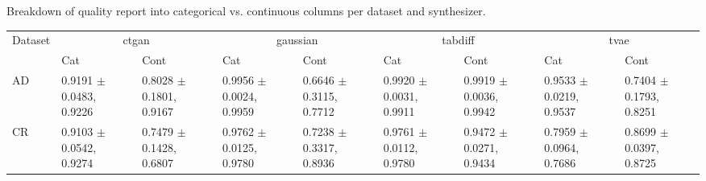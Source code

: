 \begin{tinytable}
\centering
\caption{Breakdown of quality report into categorical vs. continuous columns per dataset and synthesizer.}
\label{tab:quality_report}
\begin{tabular}{lllllllll}
\toprule
Dataset & \multicolumn{2}{c}{ctgan} & \multicolumn{2}{c}{gaussian} & \multicolumn{2}{c}{tabdiff} & \multicolumn{2}{c}{tvae} \\
 & Cat & Cont & Cat & Cont & Cat & Cont & Cat & Cont \\
\midrule
AD & 0.9191 $\pm$ 0.0483, 0.9226 & 0.8028 $\pm$ 0.1801, 0.9167 & 0.9956 $\pm$ 0.0024, 0.9959 & 0.6646 $\pm$ 0.3115, 0.7712 & 0.9920 $\pm$ 0.0031, 0.9911 & 0.9919 $\pm$ 0.0036, 0.9942 & 0.9533 $\pm$ 0.0219, 0.9537 & 0.7404 $\pm$ 0.1793, 0.8251 \\
CR & 0.9103 $\pm$ 0.0542, 0.9274 & 0.7479 $\pm$ 0.1428, 0.6807 & 0.9762 $\pm$ 0.0125, 0.9780 & 0.7238 $\pm$ 0.3317, 0.8936 & 0.9761 $\pm$ 0.0112, 0.9780 & 0.9472 $\pm$ 0.0271, 0.9434 & 0.7959 $\pm$ 0.0964, 0.7686 & 0.8699 $\pm$ 0.0397, 0.8725 \\
\bottomrule
\end{tabular}
\end{tinytable}
